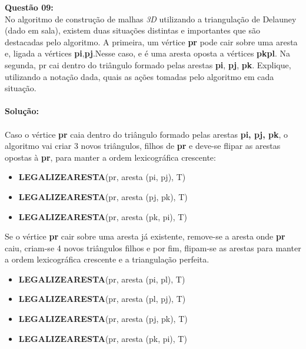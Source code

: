 \noindent\textbf{Questão 09:}\\
No algoritmo de construção de malhas \emph{3D} utilizando a triangulação de Delauney (dado
em sala), existem duas situações distintas e importantes que são destacadas pelo
algoritmo. A primeira, um vértice \textbf{pr} pode cair sobre uma aresta e, ligada a vértices \textbf{pi},\textbf{pj}.Nesse caso, e é uma aresta oposta a vértices \textbf{pkpl}. Na segunda, pr cai dentro do triângulo formado pelas arestas \textbf{pi}, \textbf{pj}, \textbf{pk}. Explique, utilizando a notação dada, quais as ações tomadas pelo algoritmo em cada situação.\\
\\
\noindent\textbf{Solução:}\\
\\
Caso o vértice \textbf{pr} caia dentro do triângulo formado pelas arestas \textbf{pi, pj, pk}, o algoritmo vai criar 3 novos triângulos, filhos de \textbf{pr} e deve-se flipar as arestas opostas à \textbf{pr}, para manter a ordem lexicográfica crescente:
\begin{itemize}
    \item \textbf{LEGALIZEARESTA}(pr, aresta (pi, pj), T)
    \item \textbf{LEGALIZEARESTA}(pr, aresta (pj, pk), T)
    \item \textbf{LEGALIZEARESTA}(pr, aresta (pk, pi), T)
\end{itemize}
Se o vértice \textbf{pr} cair sobre uma aresta já existente, remove-se a aresta onde \textbf{pr} caiu, criam-se 4 novos triângulos filhos e por fim, flipam-se as arestas para manter a ordem lexicográfica crescente e a triangulação perfeita.
\begin{itemize}
    \item \textbf{LEGALIZEARESTA}(pr, aresta (pi, pl), T)
    \item \textbf{LEGALIZEARESTA}(pr, aresta (pl, pj), T)
    \item \textbf{LEGALIZEARESTA}(pr, aresta (pj, pk), T)
    \item \textbf{LEGALIZEARESTA}(pr, aresta (pk, pi), T)
\end{itemize}
\vspace{1cm}

